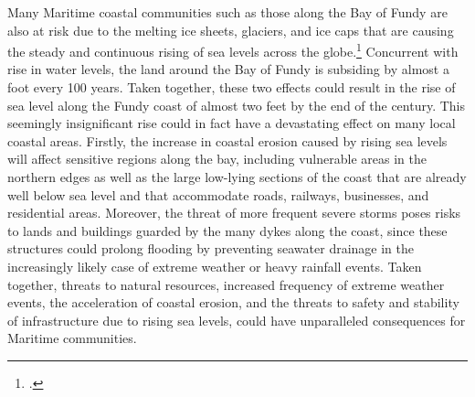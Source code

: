 Many Maritime coastal communities such as those along the Bay of Fundy are also at risk due to the melting ice sheets, glaciers, and ice caps that are causing the steady and continuous rising of sea levels across the globe.\footcite[][]{PercyRisingTide}
Concurrent with rise in water levels, the land around the Bay of Fundy is subsiding by almost a foot every 100 years.
Taken together, these two effects could result in the rise of sea level along the Fundy coast of almost two feet by the end of the century.
This seemingly insignificant rise could in fact have a devastating effect on many local coastal areas.
Firstly, the increase in coastal erosion caused by rising sea levels will affect sensitive regions along the bay, including vulnerable areas in the northern edges as well as the large low-lying sections of the coast that are already well below sea level and that accommodate roads, railways, businesses, and residential areas. 
Moreover, the threat of more frequent severe storms poses risks to lands and buildings guarded by the many dykes along the coast, since these structures could prolong flooding by preventing seawater drainage in the increasingly likely case of extreme weather or heavy rainfall events. 
Taken together, threats to natural resources, increased frequency of extreme weather events, the acceleration of coastal erosion, and the threats to safety and stability of infrastructure due to rising sea levels, could have unparalleled consequences for Maritime communities. 



